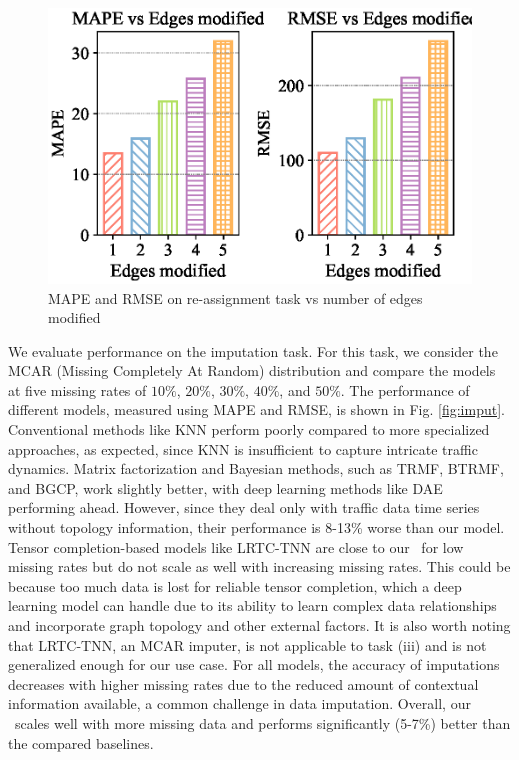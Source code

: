 \begin{figure}[t]
  \centering
  \includegraphics[width=\linewidth]{modif.eps}
  \caption{MAPE and RMSE on re-assignment task vs number of edges modified}
  \label{fig:edge_modif}
\end{figure}

We evaluate performance on the imputation task. For this task, we consider the MCAR (Missing Completely At Random) distribution and compare the models at five missing rates of $10\%$, $20\%$, $30\%$, $40\%$, and $50\%$. The performance of different models, measured using MAPE and RMSE, is shown in Fig. \ref{fig:imput}. Conventional methods like KNN perform poorly compared to more specialized approaches, as expected, since KNN is insufficient to capture intricate traffic dynamics. Matrix factorization and Bayesian methods, such as TRMF, BTRMF, and BGCP, work slightly better, with deep learning methods like DAE performing ahead. However, since they deal only with traffic data time series without topology information, their performance is 8-13\% worse than our model. Tensor completion-based models like LRTC-TNN are close to our \name\ for low missing rates but do not scale as well with increasing missing rates. This could be because too much data is lost for reliable tensor completion, which a deep learning model can handle due to its ability to learn complex data relationships and incorporate graph topology and other external factors. It is also worth noting that LRTC-TNN, an MCAR imputer, is not applicable to task (iii) and is not generalized enough for our use case. For all models, the accuracy of imputations decreases with higher missing rates due to the reduced amount of contextual information available, a common challenge in data imputation. Overall, our \name\ scales well with more missing data and performs significantly (5-7\%) better than the compared baselines.

